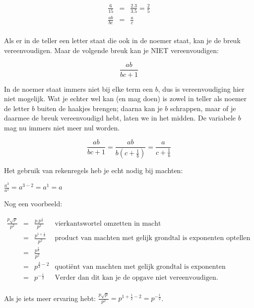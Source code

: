 \begin{itemize}
	\begin{eqnarray*}
		\frac{6}{15} & = & \frac{2.3}{3.5} = \frac{2}{5}\\
		\frac{ab}{bc} & = & \frac{a}{c} \\
	\end{eqnarray*}
	

	\noindent Als er in de teller een letter staat die ook in de noemer
	staat, kan je de breuk vereenvoudigen. Maar de volgende breuk kan
	je NIET vereenvoudigen:
	
	\begin{equation*}
		{\displaystyle \frac{ab}{bc+1}}
	\end{equation*}
	
	\noindent In de noemer staat immers niet bij elke term een $b$, dus
	is vereenvoudiging hier niet mogelijk. Wat je echter wel kan (en mag
	doen) is zowel in teller als noemer de letter $b$ buiten de haakjes
	brengen; daarna kan je $b$ schrappen, maar of je daarmee de breuk
	vereenvoudigd hebt, laten we in het midden. De variabele $b$ mag
	nu immers niet meer nul worden.
	
	\begin{equation*}
	{\displaystyle \frac{ab}{bc+1}={\displaystyle \frac{ab}{b(c+\frac{1}{b})}=\frac{a}{c+\frac{1}{b}}}}
	\end{equation*}
	
	\medskip{}
	
	
	\noindent Het gebruik van rekenregels heb je echt nodig bij machten:
	
	\noindent ${\displaystyle \frac{a^{3}}{a^{2}}=a^{3-2}=a^{1}=a}$
	
	\noindent \medskip{}
	
	
	\noindent Nog een voorbeeld:
	
	\begin{math}
	\begin{array}{ccc|r}
	{\displaystyle \frac{p\sqrt{p}}{p^{2}}} & = & {\displaystyle \frac{p.p^{\frac{1}{2}}}{p^{2}}} &   \text{vierkantswortel omzetten in macht}\\
	& = & {\displaystyle \frac{p^{1+\frac{1}{2}}}{p^{2}}} &  \text{product van machten met gelijk grondtal is exponenten optellen}\\
	& = & {\displaystyle \frac{p^{\frac{3}{2}}}{p^{2}}} &  \\
	& = & {\displaystyle p^{\frac{3}{2}-2}} &  \text{quoti\"ent van machten met gelijk grondtal is exponenten aftrekken}\\
	& = & {\displaystyle p^{-\frac{1}{2}}} &  \text{Verder dan dit kan je de opgave niet vereenvoudigen.}\\
	\end{array}
	\end{math}
	
	\noindent Als je iets meer ervaring hebt: ${\displaystyle \frac{p\sqrt{p}}{p^{2}}=p^{1+\frac{1}{2}-2}={\displaystyle p^{-\frac{1}{2}}}}$.
	
\end{itemize}


